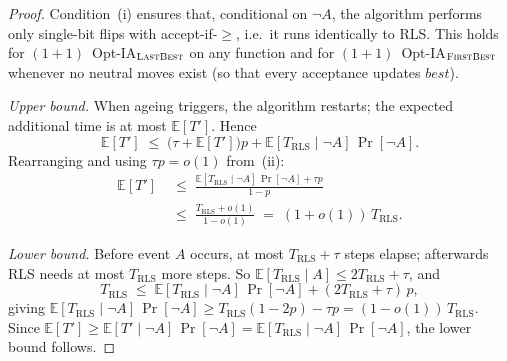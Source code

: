 \documentclass[lettersize,journal]{IEEEtran}
\newcommand{\rerev}[1]{\textcolor{purple}{#1}}
\newcommand{\EE}{\mathbb{E}}
\newcommand{\linHD}{M$_{\text{linHD}}$}
\newcommand{\IPHfcm}{IPH}
\newcommand{\firstBest}{$(1+1)$~Opt-IA$_{\textsc{FirstBest}}$}
\newcommand{\lastBest}{$(1+1)$~Opt-IA$_{\textsc{LastBest}}$}
\newtheorem{theorem}{Theorem}
\begin{document}
\begin{proof}
Condition~(i) ensures that, conditional on $\lnot A$, the algorithm performs
only single-bit flips with accept-if-$\geq$, i.e.\ it runs identically to RLS.
This holds for \lastBest{} on any function and for \firstBest{} whenever
no neutral moves exist (so that every acceptance updates $\mathit{best}$).

\textit{Upper bound.}
When ageing triggers, the algorithm restarts; the expected additional time is
at most $\EE[T']$.  Hence
\[
  \EE[T'] \;\leq\;
    \bigl(\tau + \EE[T']\bigr)p
    + \EE[T_{\mathrm{RLS}}\mid\lnot A]\,\Pr[\lnot A].
\]
Rearranging and using $\tau p=o(1)$ from~(ii):
\begin{align*}
  \EE[T'] &\;\leq\;
  \frac{\EE[T_{\mathrm{RLS}}\mid\lnot A]\,\Pr[\lnot A]+\tau p}{1-p}\\
 & \;\leq\;
  \frac{T_{\mathrm{RLS}}+o(1)}{1-o(1)}
  \;=\; (1+o(1))\,T_{\mathrm{RLS}}.
\end{align*}

\textit{Lower bound.}
Before event $A$ occurs, at most $T_{\mathrm{RLS}}+\tau$ steps elapse;
afterwards RLS needs at most $T_{\mathrm{RLS}}$ more steps.  So
$\EE[T_{\mathrm{RLS}}\mid A]\leq 2T_{\mathrm{RLS}}+\tau$, and
\[
  T_{\mathrm{RLS}} \;\leq\;
    \EE[T_{\mathrm{RLS}}\mid\lnot A]\,\Pr[\lnot A]
    + (2T_{\mathrm{RLS}}+\tau)\,p,
\]
giving $\EE[T_{\mathrm{RLS}}\mid\lnot A]\,\Pr[\lnot A]
\geq T_{\mathrm{RLS}}(1-2p)-\tau p=(1-o(1))\,T_{\mathrm{RLS}}$.
Since $\EE[T']\geq\EE[T'\mid\lnot A]\,\Pr[\lnot A]
=\EE[T_{\mathrm{RLS}}\mid\lnot A]\,\Pr[\lnot A]$, the lower bound
follows.
\end{proof}

%
%
%
\end{document}
